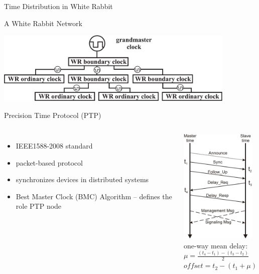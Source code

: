 \documentclass[compress,red]{beamer}
\begin{document}
\begin{frame}{Time Distribution in White Rabbit}

\center A White Rabbit Network
  \begin{center}
  \includegraphics[width=11.5cm]{network/wrTopology.pdf}
  \end{center}
\end{frame}
\begin{frame}{Precision Time Protocol (PTP)}
\begin{columns}[c]
\column{2.8in}

  \begin{itemize}
    \item IEEE1588-2008 standard
    \item packet-based protocol 
    \item synchronizes devices in distributed systems
    \item Best Master Clock (BMC) Algorithm -- defines the role PTP node 
  \end{itemize}

\column{1.5in}
    \includegraphics[height=5.5cm]{protocol/ptpMSGs.pdf} \\
    \small 
    one-way mean delay: \\
    $\mu = \frac{(t_{4}-t_{1}) - (t_{3}-t_{2})}{2}$ \\
    \small 
    $offset = t_{2} - (t_{1} + \mu)$
    
\end{columns}


\end{frame}
\end{document}
